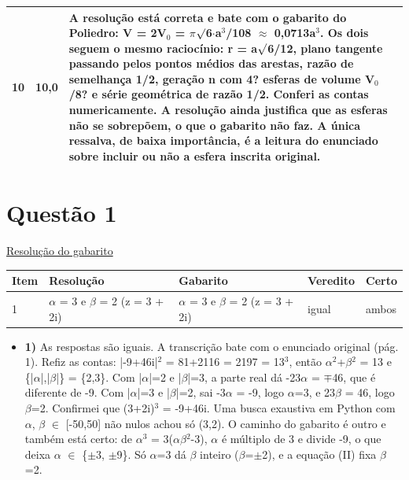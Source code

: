 \documentclass{article}%
\begin{document}
\begin{longtable}{@{}c c p{}@{}}
10 & 10,0 & A resolução está correta e bate com o gabarito do Poliedro: V = 2V$_{0}$ = $\pi$$\surd$6$\cdot$a$^3$/108 $\approx$ 0,0713a$^3$. Os dois seguem o mesmo raciocínio: r = a$\surd$6/12, plano tangente passando pelos pontos médios das arestas, razão de semelhança 1/2, geração n com 4? esferas de volume V$_{0}$/8? e série geométrica de razão 1/2. Conferi as contas numericamente. A resolução ainda justifica que as esferas não se sobrepõem, o que o gabarito não faz. A única ressalva, de baixa importância, é a leitura do enunciado sobre incluir ou não a esfera inscrita original. \\
\bottomrule\end{longtable}%
\section*{Questão 1}%
\href{https://poliedroresolve.sistemapoliedro.com.br/vestibulares/ime/2026/ime-2-fase-dia-1-23-10-2025-2-fase-dia-1/dissertativa-1-matematica-2-fase-dia-1-ime-2026}{Resolução do gabarito}\par\smallskip%
\begin{longtable}{@{}p{} p{} p{} p{} p{}@{}}\toprule Item & Resolução & Gabarito & Veredito & Certo \\ \midrule
1 & $\alpha$ = 3 e $\beta$ = 2 (z = 3 + 2i) & $\alpha$ = 3 e $\beta$ = 2 (z = 3 + 2i) & igual & ambos \\
\bottomrule\end{longtable}%
\begin{itemize}%
\item%
\textbf{1)} As respostas são iguais. A transcrição bate com o enunciado original (pág. 1). Refiz as contas: |-9+46i|$^2$ = 81+2116 = 2197 = 13$^3$, então $\alpha$$^2$+$\beta$$^2$ = 13 e \{|$\alpha$|,|$\beta$|\} = \{2,3\}. Com |$\alpha$|=2 e |$\beta$|=3, a parte real dá -23$\alpha$ = $\mp$46, que é diferente de -9. Com |$\alpha$|=3 e |$\beta$|=2, sai -3$\alpha$ = -9, logo $\alpha$=3, e 23$\beta$ = 46, logo $\beta$=2. Confirmei que (3+2i)$^3$ = -9+46i. Uma busca exaustiva em Python com $\alpha$, $\beta$ $\in$ {[}-50,50{]} não nulos achou só (3,2). O caminho do gabarito é outro e também está certo: de $\alpha$$^3$ = 3($\alpha$$\beta$$^2$-3), $\alpha$ é múltiplo de 3 e divide -9, o que deixa $\alpha$ $\in$ \{$\pm$3, $\pm$9\}. Só $\alpha$=3 dá $\beta$ inteiro ($\beta$=$\pm$2), e a equação (II) fixa $\beta$=2.%
\end{itemize}%
\end{document}
